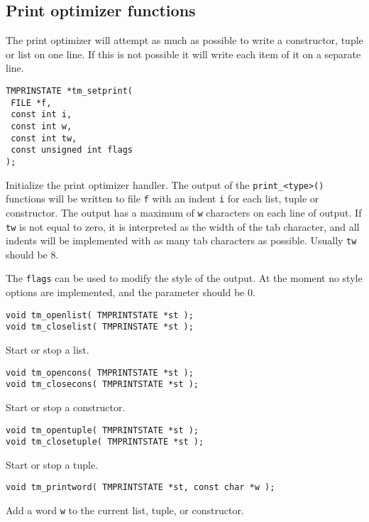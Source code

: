 \subsection{Print optimizer functions}
The print optimizer will attempt as much as possible to write a constructor,
tuple or list on one line.
If this is not possible it will write each item of it on a separate line.
\par
\begin{verbatim}
TMPRINSTATE *tm_setprint(
 FILE *f,
 const int i,
 const int w,
 const int tw,
 const unsigned int flags
);
\end{verbatim}
\begin{desc}
Initialize the print optimizer handler.
The output of the {\tt print\_<type>()} functions will be written to
file {\tt f} with an indent {\tt i} for each list, tuple or constructor.
The output has a maximum of {\tt w} characters on each line of output.
If {\tt tw} is not equal to zero, it is interpreted as the width of the
tab character, and all indents will be implemented with as many tab
characters as possible.
Usually \verb'tw' should be 8.
\par
The {\tt flags} can be used to modify the style of the output. At the
moment no style options are implemented, and the parameter should be 0.
\end{desc}
\begin{verbatim}
void tm_openlist( TMPRINTSTATE *st );
void tm_closelist( TMPRINSTATE *st );
\end{verbatim}
\begin{desc}
Start or stop a list.
\end{desc}
\begin{verbatim}
void tm_opencons( TMPRINTSTATE *st );
void tm_closecons( TMPRINTSTATE *st );
\end{verbatim}
\begin{desc}
Start or stop a constructor.
\end{desc}
\begin{verbatim}
void tm_opentuple( TMPRINTSTATE *st );
void tm_closetuple( TMPRINTSTATE *st );
\end{verbatim}
\begin{desc}
Start or stop a tuple.
\end{desc}
\begin{verbatim}
void tm_printword( TMPRINTSTATE *st, const char *w );
\end{verbatim}
\begin{desc}
Add a word {\tt w} to the current list, tuple, or constructor.
\end{desc}
